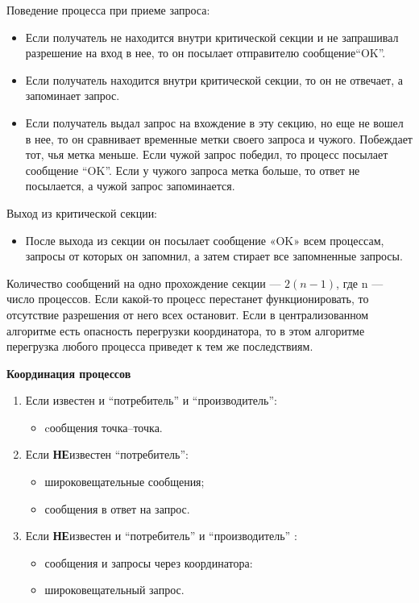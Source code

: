 \begin{enumerate}
Поведение процесса при приеме запроса:
\begin{itemize}
\item
Если получатель не находится внутри критической секции и не запрашивал разрешение на вход в нее, то он посылает отправителю сообщение``OK''.
\item
Если получатель находится внутри критической секции, то он не отвечает, а запоминает запрос.
\item
Если получатель выдал запрос на вхождение в эту секцию, но еще не вошел в нее, то он сравнивает временные метки своего запроса и чужого.
Побеждает тот, чья метка меньше.
Если чужой запрос победил, то процесс посылает сообщение ``OK''.
Если у чужого запроса метка больше, то ответ не посылается, а чужой запрос запоминается.
\end{itemize}

Выход из критической секции:
\begin{itemize}
\item
После выхода из секции он посылает сообщение «OK» всем процессам, запросы от которых он запомнил, а затем стирает все запомненные запросы.
\end{itemize}

Количество сообщений на одно прохождение секции --- $2(n-1)$, где n --- число процессов.
Если какой-то процесс перестанет функционировать, то отсутствие разрешения от него всех остановит.
Если в централизованном алгоритме есть опасность перегрузки координатора, то в этом алгоритме перегрузка любого процесса приведет к тем же последствиям.



\end{enumerate}

\centerline{\textbf{Координация процессов}}
\begin{enumerate}
\item  Если известен и ``потребитель'' и ``производитель'':
\begin{itemize} \item cообщения точка--точка. \end{itemize}
\item Если \textbf{НЕ}известен ``потребитель'':
\begin{itemize}
    \item широковещательные сообщения;
    \item сообщения в ответ на запрос.
\end{itemize}
\item Если \textbf{НЕ}известен и ``потребитель'' и ``производитель'' :
\begin{itemize}
    \item сообщения и запросы через координатора:
    \item широковещательный запрос.
\end{itemize}
\end{enumerate}

